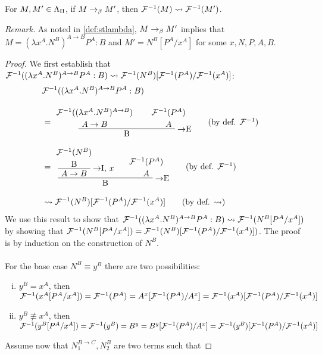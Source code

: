 \begin{proposition}
\label{proof:betaisconv}
For $M, M' \in \Lambda_\Pi$, if $M \rightarrow_\beta M'$, then $\mathcal{F}^{-1}(M) \leadsto
\mathcal{F}^{-1}(M')$.
\end{proposition}
\noindent\emph{Remark.}
As noted in \ref{def:stlambda}, $M \rightarrow_\beta M'$ implies that $M = (\lambda
x^A.N^B)^{A \to B}P^A:B$ and $M' = N^B[P^A/x^A]$ for some $x, N, P, A, B$.
\begin{proof}
We first establish that $\mathcal{F}^{-1}((\lambda x^A.N^B)^{A \to B}P^A:B) \leadsto
\mathcal{F}^{-1}(N^B)[\mathcal{F}^{-1}(P^A)/\mathcal{F}^{-1}(x^A)]$:
\begin{align*}
\lefteqn{\chmapanta((\lambda x^A.N^B)^{A \to B}P^A:B)} \\[10pt]
  &= \implelim{%
       \AxiomC{$\chmapanta((\lambda x^A.N^B)^{A \to B})$}
       \noLine
       \UnaryInfC{$A \to B$}
     }{%
       \AxiomC{$\chmapanta(P^A)$}
       \noLine
       \UnaryInfC{$A$}
     }{B}
     \DisplayProof
     \tag{by def. $\chmapanta$} \\[10pt]
  &= \implelim{%
       \implintro{
         \AxiomC{$\chmapanta(N^B)$}
         \noLine
         \UnaryInfC{B}
       }{x}{$A \to B$}
     }{%
       \AxiomC{$\chmapanta(P^A)$}
       \noLine
       \UnaryInfC{$A$}
     }{B}
     \DisplayProof
     \tag{by def. $\chmapanta$} \\[10pt]
  &\leadsto \chmapanta(N^B)[\chmapanta(P^A)/\chmapanta(x^A)]
     \tag{by def. $\leadsto$}
\end{align*}
We use this result to show that $\mathcal{F}^{-1}((\lambda x^A.N^B)^{A \to B}P^A:B)
\leadsto \mathcal{F}^{-1}(N^B[P^A/x^A])$ by showing that
$\mathcal{F}^{-1}(N^B[P^A/x^A]) = \mathcal{F}^{-1}(N^B)[\mathcal{F}^{-1}(P^A)/\mathcal{F}^{-1}(x^A)])$.
The proof is by induction on the construction of $N^B$. \\
\\
For the base case $N^B \equiv y^B$ there are two possibilities:
\begin{enumerate}[(i)]
  \item $y^B = x^A$, then \\
        $\mathcal{F}^{-1}(x^A[P^A/x^A]) = \mathcal{F}^{-1}(P^A) =
        A^x[\mathcal{F}^{-1}(P^A)/A^x] =
        \mathcal{F}^{-1}(x^A)[\mathcal{F}^{-1}(P^A)/\mathcal{F}^{-1}(x^A)]$
  \item $y^B \not\equiv x^A$, then \\
        $\mathcal{F}^{-1}(y^B[P^A/x^A]) = \mathcal{F}^{-1}(y^B) = B^y =
        B^y[\mathcal{F}^{-1}(P^A)/A^x] =
        \mathcal{F}^{-1}(y^B)[\mathcal{F}^{-1}(P^A)/\mathcal{F}^{-1}(x^A)]$
\end{enumerate}
Assume now that $N_1^{B \to C}, N_2^B$ are two terms such that

\end{proof}

